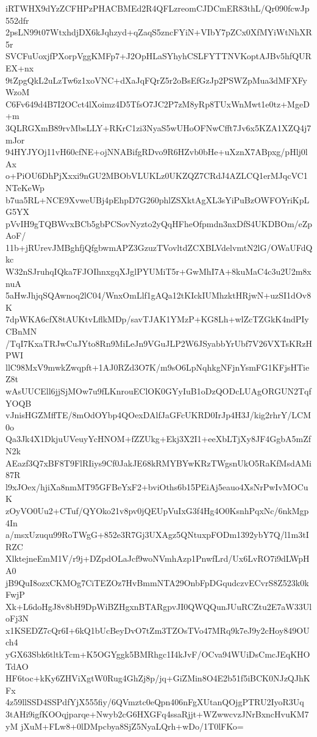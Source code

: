 iRTWHX9dYzZCFHPzPHACBMEd2R4QFLzreomCJDCmER83thL/Qr090fcwJp552dfr
2psLN99t07WtxhdjDX6kJqhzyd+qZaqS5zncFYiN+VIbY7pZCx0XfMYiWtNhXR5r
SVCFuUoxjfPXorpVggKMFp7+J2OpHLaSYhyhCSLFYTTNVKoptAJBv5hfQUREX+nx
9tZpgQkL2uLzTw6z1xoVNC+dXaJqFQrZ5r2oBsEfGzJp2PSWZpMua3dMFXFyWzoM
C6Fv649d4B7I2OCct4lXoimz4D5TfsO7JC2P7zM8yRp8TUxWnMwt1e0tz+MgeD+m
3QLRGXmB89rvMbsLLY+RKrC1zi3NyaS5wUHoOFNwCfft7Jv6x5KZA1XZQ4j7mJor
94HYJYOj11vH60cfNE+ojNNABifgRDvo9R6HZvb0bHe+uXznX7ABpxg/pHlj0lAx
o+PiOU6DhPjXxxi9nGU2MBObVLUKLz0UKZQZ7CRdJ4AZLCQ1erMJqcVC1NTeKeWp
b7ua5RL+NCE9XvweUBj4pEhpD7G260phlZSXktAgXL3sYiPuBzOWFOYriKpLG5YX
pVvIH9gTQBWvxBCb5gbPCSovNyzto2yQqHFheOfpmdn3nxDfS4UKDBOm/eZpAoF/
11b+jRUrevJMBghfjQfgbwmAPZ3GzuzTVovltdZCXBLVdelvmtN2lG/OWaUFdQkc
W32nSJruhqIQka7FJOIhnxgqXJglPYUMiT5r+GwMhI7A+8kuMaC4c3u2U2m8xnuA
5aHwJhjqSQAwnoq2lC04/WnxOmLlf1gAQa12tKIckIUMhzktHRjwN+uzSI1dOv8K
7dpWKA6cfX8tAUKtvLflkMDp/savTJAK1YMzP+KG8Lh+wlZcTZGkK4ndPIyCBnMN
/TqI7KxaTRJwCuJYto8Rn9MiLeJn9VGuJLP2W6JSyabbYrUbf7V26VXTsKRzHPWI
llC98MxV9mwkZwqpft+1AJ0RZd3O7K/m9sO6LpNqhkgNFjnYsmFG1KFjsHTieZ8t
wAsUUCEll6jjSjMOw7u9fLKnrouEClOK0GYyIuB1oDzQODcLUAgORGUN2TqfYOQB
vJnisHGZMffTE/8mOdOYbp4QOexDAlfJaGFcUKRD0IrJp4H3J/kig2rhrY/LCM0o
Qa3Jk4X1DkjuUVeuyYcHNOM+fZZUkg+Ekj3X2I1+eeXbLTjXy8JF4GgbA5mZfN2k
AEazf3Q7xBF8T9FlRIiys9Cf0JakJE68kRMYBYwKRzTWgsnUkO5RaKfMsdAMi87R
l9xJOex/hjiXa8nmMT95GFBeYxF2+bviOths6b15PEiAj5eauo4XsNrPwIvMOCuK
zOyVO0Uu2+CTuf/QYOko21v8pv0jQEUpVuIxG3f4Hg4O0KsnhPqxNc/6nkMgp4In
a/msxUzuqu99RoTWgG+852e3R7Gj3UXAgz5QNtuxpFODm1392ybY7Q/l1m3tIRZC
XlktejneEmM1V/r9j+DZpdOLaJcf9woNVmhAzp1PnwfLrd/Ux6LvRO7i9dLWpHA0
jB9QuI8ozxCKMOg7CiTEZOz7HvBmmNTA29OnbFpDGqudczvECvrS8Z523k0kFwjP
Xk+L6doHgJ8v8bH9DpWiBZHgxnBTARgpvJI0QWQQunJUuRCZtu2E7aW33UloFj3N
x1KSEDZ7cQr6I+6kQ1bUcBeyDvO7tZm3TZOsTVo47MRq9k7eJ9y2cHoy849OUch4
yGX63Sbk6tltkTcm+K5OGYggk5BMRhgc1I4kJvF/OCva94WUiDsCmcJEqKHOTdAO
HF6toc+kKy6ZHViXgtW0Rug4GhZj8p/jq+GiZMin8O4E2b51f5iBCK0NJzQJhKFx
4z59llSSD4SSPdfYjX555fiy/6QVmztc0eQpn406nFgXUtanQOjgPTRU2IyoR3Uq
3tAHi9igfKOOqjparqe+Nwyb2cG6HXGFq4ssaRjjt+WZwwcvzJNrBxncHvuKM7yM
jXuM+FLw8+0lDMpcbya8SjZ5NyaLQrh+wDo/1T0lFKo=
